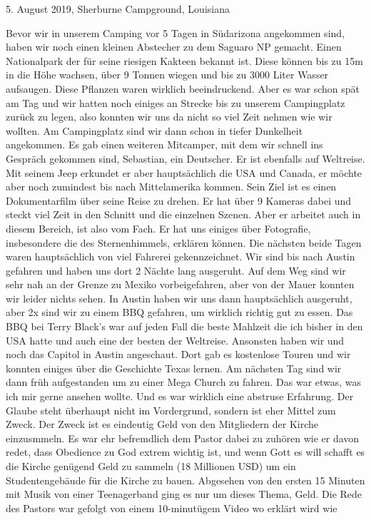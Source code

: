 \documentclass[11pt]{book}
\begin{document}
5. August 2019, Sherburne Campground, Louisiana

Bevor wir in unserem Camping vor 5 Tagen in Südarizona angekommen sind, haben wir noch einen kleinen Abstecher zu dem Saguaro NP gemacht. Einen Nationalpark 
der für seine riesigen Kakteen bekannt ist. Diese können bis zu 15m in die Höhe wachsen, über 9 Tonnen wiegen und bis zu 3000 Liter Wasser aufsaugen. Diese 
Pflanzen waren wirklich beeindruckend. Aber es war schon spät am Tag und wir hatten noch einiges an Strecke bis zu unserem Campingplatz zurück zu legen, also 
konnten wir uns da nicht so viel Zeit nehmen wie wir wollten. Am Campingplatz sind wir dann schon in tiefer Dunkelheit angekommen. Es gab einen weiteren Mitcamper, 
mit dem wir schnell ins Gespräch gekommen sind, Sebastian, ein Deutscher. Er ist ebenfalls auf Weltreise. Mit seinem Jeep erkundet er aber hauptsächlich die 
USA und Canada, er möchte aber noch zumindest bis nach Mittelamerika kommen. Sein Ziel ist es einen Dokumentarfilm über seine Reise zu drehen. Er hat 
über 9 Kameras dabei und steckt viel Zeit in den Schnitt und die einzelnen Szenen. Aber er arbeitet auch in diesem Bereich, ist also vom Fach. Er hat uns 
einiges über Fotografie, insbesondere die des Sternenhimmels, erklären können. 
Die nächsten beide Tagen waren hauptsächlich von viel Fahrerei gekennzeichnet. Wir sind bis nach Austin gefahren und haben uns dort 2 Nächte lang ausgeruht. 
Auf dem Weg sind wir sehr nah an der Grenze zu Mexiko vorbeigefahren, aber von der Mauer konnten wir leider nichts sehen. 
In Austin haben wir uns dann hauptsächlich ausgeruht, aber 2x sind wir zu einem BBQ gefahren, um wirklich richtig gut zu essen. Das BBQ bei Terry Black's war auf 
jeden Fall die beste Mahlzeit die ich bisher in den USA hatte und auch eine der besten der Weltreise. Ansonsten haben wir und noch das Capitol in Austin angeschaut. 
Dort gab es kostenlose Touren und wir konnten einiges über die Geschichte Texas lernen. 
Am nächsten Tag sind wir dann früh aufgestanden um zu einer Mega Church zu fahren. Das war etwas, was ich mir gerne ansehen wollte. Und es war wirklich eine 
abstruse Erfahrung. Der Glaube steht überhaupt nicht im Vordergrund, sondern ist eher Mittel zum Zweck. Der Zweck ist es eindeutig Geld von den Mitgliedern der 
Kirche einzusmmeln. Es war ehr befremdlich dem Pastor dabei zu zuhören wie er davon redet, dass Obedience zu God extrem wichtig ist, und wenn Gott es will 
schafft es die Kirche genügend Geld zu sammeln (18 Millionen USD) um ein Studentengebäude für die Kirche zu bauen. Abgesehen von den ersten 15 Minuten 
mit Musik von einer Teenagerband ging es nur um dieses Thema, Geld. Die Rede des Pastors war gefolgt von einem 10-minutügem Video wo erklärt wird wie 
\end{document}
